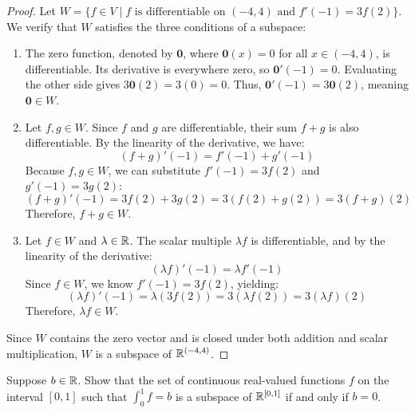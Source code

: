 \begin{proof}
	Let $W = \{f \in V \mid f \text{ is differentiable on } (-4, 4) \text{ and } f'(-1) = 3f(2)\}$. We verify that $W$ satisfies the three conditions of a subspace:
	
	\begin{enumerate}
		\item {} The zero function, denoted by $\mathbf{0}$, where $\mathbf{0}(x) = 0$ for all $x \in (-4, 4)$, is differentiable. Its derivative is everywhere zero, so $\mathbf{0}'(-1) = 0$. Evaluating the other side gives $3\mathbf{0}(2) = 3(0) = 0$. Thus, $\mathbf{0}'(-1) = 3\mathbf{0}(2)$, meaning $\mathbf{0} \in W$.
		
		\item {} Let $f, g \in W$. Since $f$ and $g$ are differentiable, their sum $f + g$ is also differentiable. By the linearity of the derivative, we have:
		\[ (f + g)'(-1) = f'(-1) + g'(-1) \]
		Because $f, g \in W$, we can substitute $f'(-1) = 3f(2)$ and $g'(-1) = 3g(2)$:
		\[ (f + g)'(-1) = 3f(2) + 3g(2) = 3(f(2) + g(2)) = 3(f + g)(2) \]
		Therefore, $f + g \in W$.
		
		\item {} Let $f \in W$ and $\lambda \in \mathbb{R}$. The scalar multiple $\lambda f$ is differentiable, and by the linearity of the derivative:
		\[ (\lambda f)'(-1) = \lambda f'(-1) \]
		Since $f \in W$, we know $f'(-1) = 3f(2)$, yielding:
		\[ (\lambda f)'(-1) = \lambda(3f(2)) = 3(\lambda f(2)) = 3(\lambda f)(2) \]
		Therefore, $\lambda f \in W$.
	\end{enumerate}
	
	Since $W$ contains the zero vector and is closed under both addition and scalar multiplication, $W$ is a subspace of $\mathbb{R}^{(-4,4)}$.
\end{proof}
\begin{question}
	Suppose $b \in \mathbb{R}$. Show that the set of continuous real-valued functions $f$ on the interval $[0, 1]$ such that $\int_0^1 f = b$ is a subspace of $\mathbb{R}^{[0,1]}$ if and only if $b = 0$.
\end{question}
